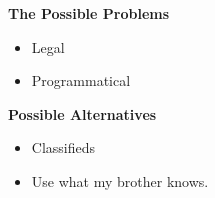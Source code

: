 \documentclass[grey,handout]{beamer}
\renewcommand{\frametitle}[1]{\begin{center}\textbf{#1}\end{center}}
\begin{document}
\begin{frame}
  \frametitle{The Possible Problems}
  \begin{itemize}
    \item Legal
    \item Programmatical
  \end{itemize}
\end{frame}


\begin{frame}
  \frametitle{Possible Alternatives}
  \begin{itemize}
    \item Classifieds
    \item Use what my brother knows.
  \end{itemize}
\end{frame}
\end{document}
